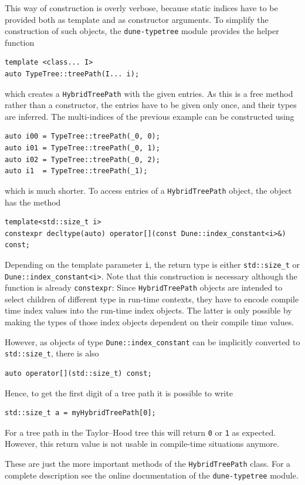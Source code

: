 \documentclass[a4paper,10pt,headings=normal,bibliography=totoc]{scrartcl}
\newcommand{\cpp}[1]{\lstinline[basicstyle=\ttfamily]!#1!}
\newcommand{\dunemodule}[1]{\texttt{#1}}
\begin{document}
This way of construction is overly verbose, because static indices have
to be provided both as template and as constructor arguments.
To simplify the construction of such objects, the \dunemodule{dune-typetree}
module provides the helper function
\begin{lstlisting}[style=Interface]
template <class... I>
auto TypeTree::treePath(I... i);
\end{lstlisting}
which creates a \cpp{HybridTreePath} with the given entries.
As this is a free method rather than a constructor, the entries have to be
given only once, and their types are inferred.
The multi-indices of the previous example can be constructed using
\begin{lstlisting}[style=Example]
auto i00 = TypeTree::treePath(_0, 0);
auto i01 = TypeTree::treePath(_0, 1);
auto i02 = TypeTree::treePath(_0, 2);
auto i1  = TypeTree::treePath(_1);
\end{lstlisting}
which is much shorter.
To access entries of a \cpp{HybridTreePath} object, the object has
the method
%
\begin{lstlisting}[style=Interface]
template<std::size_t i>
constexpr decltype(auto) operator[](const Dune::index_constant<i>&) const;
\end{lstlisting}
%
Depending on the template parameter \cpp{i}, the return type is either \cpp{std::size_t}
or \cpp{Dune::index_constant<i>}.
Note that this construction is necessary although the function is already
\cpp{constexpr}:
Since \cpp{HybridTreePath} objects are intended to select
children of different type in run-time contexts, they have to encode
compile time index values into the run-time index objects.
The latter is only possible by making the types of those index objects
dependent on their compile time values.

However, as objects of type \cpp{Dune::index_constant} can be implicitly converted
to \cpp{std::size_t}, there is also
%
\begin{lstlisting}[style=Interface]
auto operator[](std::size_t) const;
\end{lstlisting}
%
Hence, to get the first digit of a tree path it is possible to write
\begin{lstlisting}[style=Example]
std::size_t a = myHybridTreePath[0];
\end{lstlisting}
For a tree path in the Taylor--Hood tree this will return \cpp{0} or \cpp{1}
as expected.  However, this return value is not usable in compile-time situations
anymore.

These are just the more important methods of the \cpp{HybridTreePath} class.
For a complete description see the online
documentation of the \dunemodule{dune-typetree} module.
\end{document}

